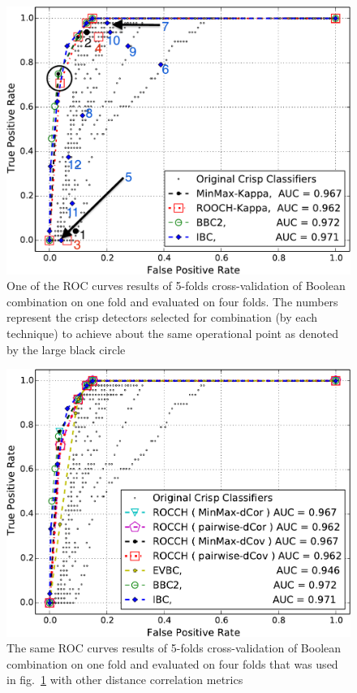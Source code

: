 \begin{figure}[t]
\centering
\includegraphics[width=\columnwidth]{figs/roc_curves_testing_fold3}
\caption{One of the ROC curves results of 5-folds cross-validation of Boolean combination on one fold and evaluated on four folds. The numbers represent the crisp detectors selected for combination (by each technique) to achieve about the same operational point as denoted by the large black circle}
\label{fig:roc_curves}
\end{figure}

\begin{figure}[t]
\centering
\includegraphics[scale=0.85]{figs/ADFA-dcov/IBC_BCC_Pruned_Classifier_ConvexHull_withoutRandom_validation}
\caption{The same ROC curves results of 5-folds cross-validation of Boolean combination on one fold and evaluated on four folds that was used in fig.~\ref{fig:roc_curves} with other distance correlation metrics}
\label{fig:roc_curves_dcov}
\end{figure}



